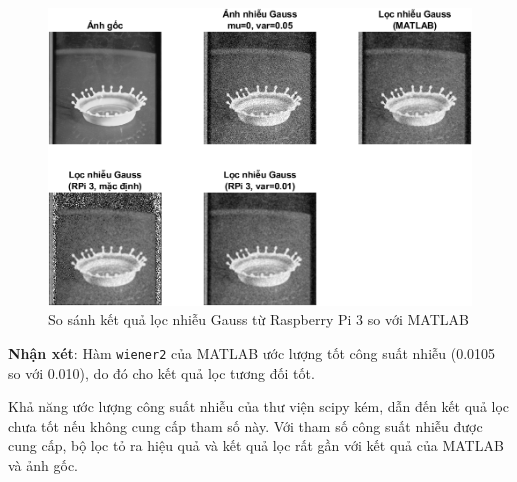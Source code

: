 \begin{figure}[H]
    \centering
    \includegraphics[width=1\linewidth]{images/gaussian_compare.png}
    \caption{So sánh kết quả lọc nhiễu Gauss từ Raspberry Pi 3 so với MATLAB}
\end{figure}

\textbf{Nhận xét}: Hàm \texttt{wiener2} của MATLAB ước lượng tốt công suất nhiễu (0.0105 so với 0.010), do đó cho kết quả lọc tương đối tốt. 

Khả năng ước lượng công suất nhiễu của thư viện scipy kém, dẫn đến kết quả lọc chưa tốt nếu không cung cấp tham số này. Với tham số công suất nhiễu được cung cấp, bộ lọc tỏ ra hiệu quả và kết quả lọc rất gần với kết quả của MATLAB và ảnh gốc.